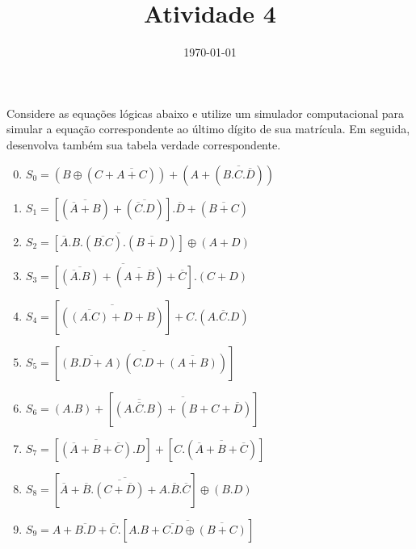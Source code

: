 \documentclass[a4paper, 11pt]{article}
\date{\today}
\title{Atividade 4}
\begin{document}
    \normalfont
    \header{}

    \begin{question}
        Considere as equações lógicas abaixo e utilize um simulador computacional para simular a equação correspondente ao último dígito de sua matrícula. Em seguida, desenvolva também sua tabela verdade correspondente.
        \vspace{-3mm}
        \begin{enumerate}
            \setcounter{enumi}{-1}
            \item $S_0 = (B \oplus (C+\overline{A+C}))+(A + (\overline{B.C.\overline{D}}))$
            \item $S_1 = [(\overline{\overline{A}+B}) + (\overline{\overline{C}.D})].\overline{D} + (\overline{B+C})$
            \item $S_2 = \overline{[\overline{A}.B.(\overline{B.C}).(\overline{B+D})]}\oplus (A+D)$
            \item $S_3 = \overline{[\overline{(\overline{A}.B)} + (\overline{A + \overline{B}})+\overline{C}]}.(C+D)$
            \item $S_4 = [\overline{(\overline{(A.C)}+D+B)}]+C.(\overline{A.C.D})$
            \item $S_5 = [\overline{\overline{(B.D+A)}(C.D + \overline{(A+B)})}]$
            \item $S_6 = (A.B)+[\overline{\overline{(A.\overline{C}.B)}+(B+C+\overline{D})}]$
            \item $S_7 = [\overline{(\overline{A}+B+\overline{C})}.D]+[C.(\overline{\overline{A}+B+\overline{C}})]$
            \item $S_8 = [\overline{\overline{A} + \overline{B}.\overline{(C+\overline{D})}+A.\overline{B}.\overline{C}}]\oplus (B.D)$
            \item $S_9 = A + \overline{B.D} + \overline{C}.[\overline{A.B+\overline{C.D} \oplus \overline{(B+C)}}]$
        \end{enumerate}
    \end{question}
    
\end{document}
